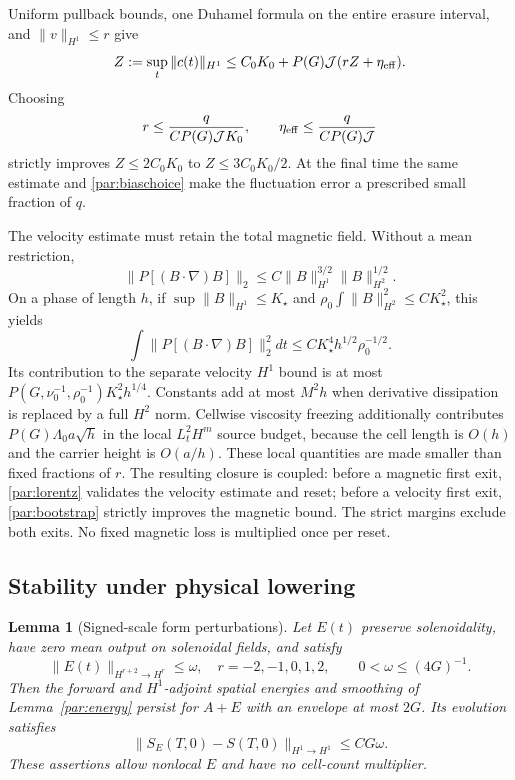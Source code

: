 \documentclass[11pt,a4paper]{amsart}
\newtheorem{lemma}[theorem]{Lemma}
\theoremstyle{definition}
\theoremstyle{remark}
\numberwithin{equation}{section}
\begin{document}
Uniform pullback bounds, one Duhamel formula on the entire erasure interval,
and $\|v\|_{H^1}\le r$ give
\begin{equation}\label{par:bootstrap}
 Z:=\sup_t\|c(t)\|_{H^1}
 \le C_0K_0+P(G)\mathcal J(rZ+\eta_{\rm eff}).
\end{equation}
Choosing
\begin{equation}\label{par:nonlinearchoice}
 r\le\frac{q}{C P(G)\mathcal J K_0},\qquad
 \eta_{\rm eff}\le\frac{q}{C P(G)\mathcal J}
\end{equation}
strictly improves $Z\le2C_0K_0$ to $Z\le3C_0K_0/2$. At the final time
the same estimate and \eqref{par:biaschoice} make the fluctuation error a
prescribed small fraction of $q$.

The velocity estimate must retain the total magnetic field. Without a mean
restriction,
\[
 \|P[(B\cdot\nabla)B]\|_2
 \le C\|B\|_{H^1}^{3/2}\|B\|_{H^2}^{1/2}.
\]
On a phase of length $h$, if
$\sup\|B\|_{H^1}\le K_\star$ and
$\rho_0\int\|B\|_{H^2}^2\le CK_\star^2$, this yields
\begin{equation}\label{par:lorentz}
 \int\|P[(B\cdot\nabla)B]\|_2^2dt
 \le CK_\star^4h^{1/2}\rho_0^{-1/2}.
\end{equation}
Its contribution to the separate velocity $H^1$ bound is at most
$P(G,\nu_0^{-1},\rho_0^{-1})K_\star^2h^{1/4}$.
Constants add at most $M^2h$ when derivative dissipation is replaced by a
full $H^2$ norm. Cellwise viscosity freezing additionally contributes
$P(G)\Lambda_0a\sqrt h$ in the local $L^2_tH^m$ source budget, because the
cell length is $O(h)$ and the carrier height is $O(a/h)$.
These local quantities are made smaller than fixed fractions of $r$.
The resulting closure is coupled: before a magnetic first exit,
\eqref{par:lorentz} validates the velocity estimate and reset; before a
velocity first exit, \eqref{par:bootstrap} strictly improves the magnetic
bound. The strict margins exclude both exits. No fixed magnetic loss is
multiplied once per reset.

\subsection{Stability under physical lowering}

\begin{lemma}[Signed-scale form perturbations]\label{par:perturbation}
Let $E(t)$ preserve solenoidality, have zero mean output on solenoidal fields,
and satisfy
\begin{equation}\label{par:signeddefect}
 \|E(t)\|_{H^{r+2}\to H^r}\le\omega,
 \quad r=-2,-1,0,1,2,\qquad 0<\omega\le(4G)^{-1}.
\end{equation}
Then the forward and $H^1$-adjoint spatial energies and smoothing of
Lemma~\ref{par:energy} persist for $A+E$ with an envelope at most $2G$.
Its evolution satisfies
\begin{equation}\label{par:perturbationbound}
 \|S_E(T,0)-S(T,0)\|_{H^1\to H^1}\le CG\omega.
\end{equation}
These assertions allow nonlocal $E$ and have no cell-count multiplier.
\end{lemma}
\end{document}
